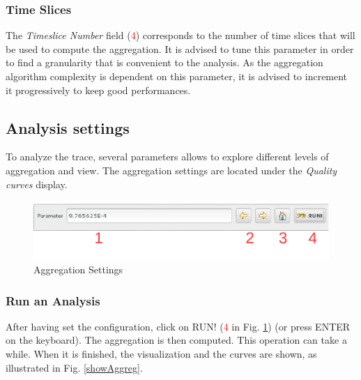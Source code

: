 \documentclass[twoside]{article}
\begin{document}
\begin{sloppypar}
\subsubsection{Time Slices}
The \textit{Timeslice Number} field (\textcolor{red}{4}) corresponds to the number of time slices that will be used to compute the aggregation. It is advised to tune this parameter in order to find a granularity that is convenient to the analysis. As the aggregation algorithm complexity is dependent on this parameter, it is advised to increment it progressively to keep good performances.

\subsection{Analysis settings}
To analyze the trace, several parameters allows to explore  different levels of aggregation and view. The aggregation settings are located under the \textit{Quality curves} display.
 
\begin{figure}[h!]
	\centering
	\includegraphics[scale=1.0]{images/aggregationSettings.pdf}
	\caption{Aggregation Settings}
	\label{aggregSettings}
\end{figure}

\subsubsection{Run an Analysis}
After having set the configuration, click on RUN! (\textcolor{red}{4} in Fig. \ref{aggregSettings}) (or press ENTER on the keyboard). The aggregation is then computed. This operation can take a while. When it is finished, the visualization and the curves are shown, as illustrated in Fig. \ref{showAggreg}.


\end{sloppypar}
\end{document}
